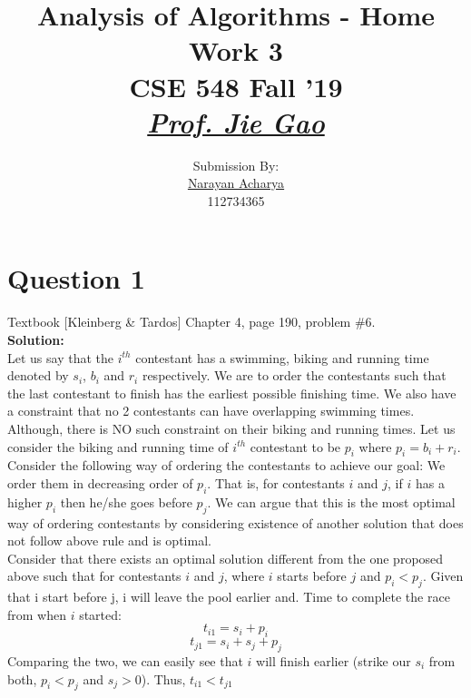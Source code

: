 \documentclass[11pt]{article}
\title{
	Analysis of Algorithms - Home Work 3\\[2mm]
	\large CSE 548 Fall '19\\[1mm]
	\href{mailto:jgao@cs.stonybrook.edu}{\textit{Prof. Jie Gao}}
}
\author{
	\small Submission By: \\
	\href{mailto:nacharya@cs.stonybrook.edu}{Narayan Acharya} \\
	\small 112734365
}
\date{\vspace{-5ex}}
\begin{document}
\maketitle
\thispagestyle{fancy} %

\tableofcontents

\clearpage

\section{Question 1} Textbook [Kleinberg \& Tardos] Chapter 4, page 190, problem \#6. \\
\textbf{Solution:} \\

Let us say that the $ i^{th} $ contestant has a swimming, biking and running time denoted by $ s_i $, $ b_i $ and $ r_i $ respectively. We are to order the contestants such that the last contestant to finish has the earliest possible finishing time. We also have a constraint that no 2 contestants can have overlapping swimming times. Although, there is NO such constraint on their biking and running times. Let us consider the biking and running time of $ i^{th} $ contestant to be $ p_i $ where $ p_i = b_i + r_i $. \\

Consider the following way of ordering the contestants to achieve our goal: We order them in decreasing order of $ p_i $. That is, for contestants $ i $ and $ j $, if $ i $ has a higher $ p_i $ then he/she goes before $ p_j $. We can argue that this is the most optimal way of ordering contestants by considering existence of another solution that does not follow above rule and is optimal. \\

Consider that there exists an optimal solution different from the one proposed above such that for contestants $ i $ and $ j $, where $ i $ starts before $ j $ and $ p_i < p_j $. Given that i start before j, i will leave the pool earlier and. Time to complete the race from when $ i $ started: 
\begin{equation*}
	t_{i1} = s_i + p_i
\end{equation*}
\begin{equation*}
	t_{j1} = s_i + s_j + p_j
\end{equation*}
Comparing the two, we can easily see that $ i $ will finish earlier (strike our $ s_i $ from both, $ p_i < p_j $ and $ s_j > 0 $). Thus, $ t_{i1} < t_{j1} $\\
\end{document}
